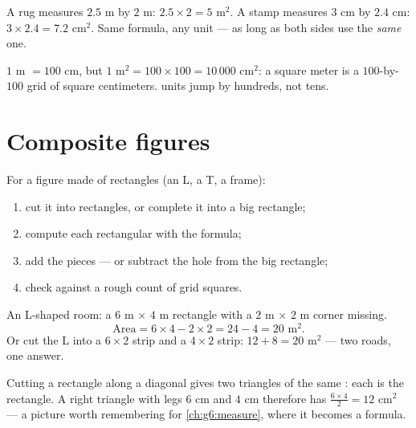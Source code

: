 \begin{example}\label{ex:g5:areas:rectangle}
A rug measures $2.5$ m by $2$ m:  $2.5 \times 2 = 5$ m$^2$.
A stamp measures $3$ cm by $2.4$ cm:  $3 \times 2.4 = 7.2$
cm$^2$. Same formula, any unit --- as long as both sides use the
\emph{same} one.
\end{example}

\begin{example}\label{ex:g5:areas:units}
$1$ m $= 100$ cm, but $1$ m$^2 = 100 \times 100 = 10\,000$ cm$^2$:
a square meter is a $100$-by-$100$ grid of square centimeters. 
units jump by hundreds, not tens.
\end{example}

\section{Composite figures}

\begin{method}\label{met:g5:areas:composite}
For a figure made of rectangles (an L, a T, a frame):
\begin{enumerate}
  \item cut it into rectangles, or complete it into a big rectangle;
  \item compute each rectangular  with the formula;
  \item add the pieces --- or subtract the hole from the big
        rectangle;
  \item check against a rough count of grid squares.
\end{enumerate}
\end{method}

\begin{example}\label{ex:g5:areas:composite}
An L-shaped room: a $6$ m $\times$ $4$ m rectangle with a
$2$ m $\times$ $2$ m corner missing.
\[
\text{Area} = 6 \times 4 - 2 \times 2 = 24 - 4 = 20 \text{ m}^2 .
\]
Or cut the L into a $6 \times 2$ strip and a $4 \times 2$ strip:
$12 + 8 = 20$ m$^2$ --- two roads, one answer.
\end{example}

\begin{example}\label{ex:g5:areas:halfrect}
Cutting a rectangle along a diagonal gives two triangles of the same
: each is \emph{} the rectangle. A right triangle with legs
$6$ cm and $4$ cm therefore has  $\frac{6 \times 4}{2} = 12$
cm$^2$ --- a picture worth remembering for
\cref{ch:g6:measure}, where it becomes a formula.
\end{example}

